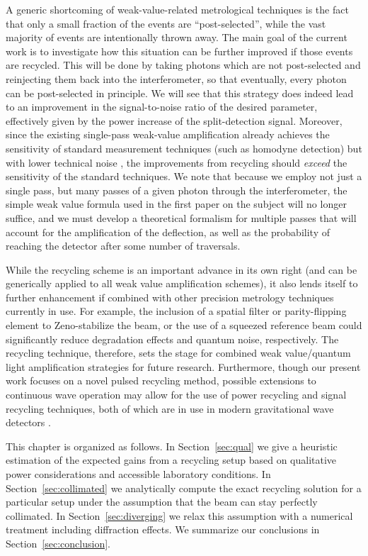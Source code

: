A generic shortcoming of weak-value-related metrological techniques is the fact that only a small fraction of the events are ``post-selected'', while the vast majority of events are intentionally thrown away.  The main goal of the current work is to investigate how this situation can be further improved if those events are recycled.  This will be done by taking photons which are not post-selected and reinjecting them back into the interferometer, so that eventually, every photon can be post-selected in principle.  We will see that this strategy does indeed lead to an improvement in the signal-to-noise ratio of the desired parameter, effectively given by the power increase of the split-detection signal.  Moreover, since the existing single-pass weak-value amplification already achieves the sensitivity of standard measurement techniques (such as homodyne detection) but with lower technical noise \cite{Starling2009}, the improvements from recycling should \emph{exceed} the sensitivity of the standard techniques.  We note that because we employ not just a single pass, but many passes of a given photon through the interferometer, the simple weak value formula used in the first paper on the subject \cite{Dixon2009} will no longer suffice, and we must develop a theoretical formalism for multiple passes that will account for the amplification of the deflection, as well as the probability of reaching the detector after some number of traversals.

While the recycling scheme is an important advance in its own right (and can be generically applied to all weak value amplification schemes), it also lends itself to further enhancement if combined with other precision metrology techniques currently in use.  For example, the inclusion of a spatial filter or parity-flipping element to Zeno-stabilize the beam, or the use of a squeezed reference beam \cite{Caves1981,Barnett2003,Treps2002,Treps2003} could significantly reduce degradation effects and quantum noise, respectively.  The recycling technique, therefore, sets the stage for combined weak value/quantum light amplification strategies for future research.  Furthermore, though our present work focuses on a novel pulsed recycling method, possible extensions to continuous wave operation may allow for the use of power recycling \cite{Drever1983} and signal recycling \cite{Meers1991} techniques, both of which are in use in modern gravitational wave detectors \cite{Schnier1997,Vahlbruch2005}. 

This chapter is organized as follows.  In Section~\ref{sec:qual} we give a heuristic estimation of the expected gains from a recycling setup based on qualitative power considerations and accessible laboratory conditions.  In Section~\ref{sec:collimated} we analytically compute the exact recycling solution for a particular setup under the assumption that the beam can stay perfectly collimated.  In Section~\ref{sec:diverging} we relax this assumption with a numerical treatment including diffraction effects.  We summarize our conclusions in Section~\ref{sec:conclusion}.

